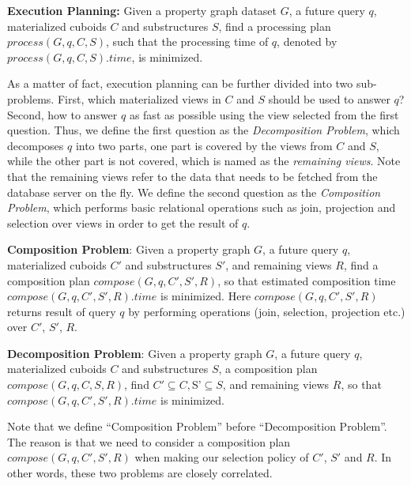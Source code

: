 \noindent\textbf{Execution Planning:} Given a property graph dataset $G$, a future query $q$, materialized cuboids $C$ and substructures $S$, find a processing plan $process(G, q, C, S)$, such that the processing time of $q$, denoted by $process(G, q, C, S).time$, is minimized. 

As a matter of fact, execution planning can be further divided into two sub-problems. 
First, which materialized views in $C$ and $S$ should be used to answer $q$? Second, how to answer $q$ as fast as possible using the view selected from the first question. Thus, we define the first question as the \emph{Decomposition Problem}, which decomposes $q$ into two parts, one part is covered by the views from $C$ and $S$, while the other part is not covered, which is named as the \emph{remaining views}. Note that the remaining views refer to the data that needs to be fetched from the database server on the fly. We  define the second question as the \emph{Composition Problem}, which performs basic relational operations such as join, projection and selection over views in order to get the result of $q$. 

\noindent\textbf{Composition Problem}:
Given a property graph $G$, a future query $q$, materialized cuboids $C'$ and substructures $S'$, and remaining views $R$, find a composition plan $compose(G, q, C', S', R)$, so that estimated composition time $compose(G, q, C', S', R).time$ is minimized. Here $compose(G, q, C', S', R)$ returns result of query $q$ by performing operations (join, selection, projection etc.) over $C'$, $S'$, $R$.


\noindent\textbf{Decomposition Problem}:
Given a property graph $G$, a future query $q$, materialized cuboids $C$ and substructures $S$, a composition plan $compose(G, q, C, S, R)$, find $C' \subseteq C, $S'$\subseteq S$, and remaining views $R$, so that $compose(G, q, C', S', R).time$ is minimized. 

Note that we define ``Composition Problem'' before ``Decomposition Problem''. The reason is that we need to consider a composition plan $compose(G, q, C', S', R)$ when making our selection policy of $C'$, $S'$ and $R$. In other words, these two problems are closely correlated.  

